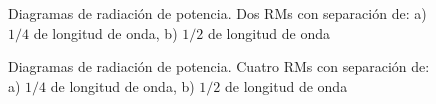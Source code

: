 \begin{figure}[H]
	\centering
	\caption{Diagramas de radiación de potencia. Dos RMs con separación de: a) $1/4$ de longitud de onda, b) $1/2$ de longitud de onda}
	\label{fig:twoArrayPat}
\end{figure}

\begin{figure}[H]
	\centering
	\caption{Diagramas de radiación de potencia. Cuatro RMs con separación de: a) $1/4$ de longitud de onda, b) $1/2$ de longitud
		de onda}
	\label{fig:fourArrayPat}
\end{figure}

